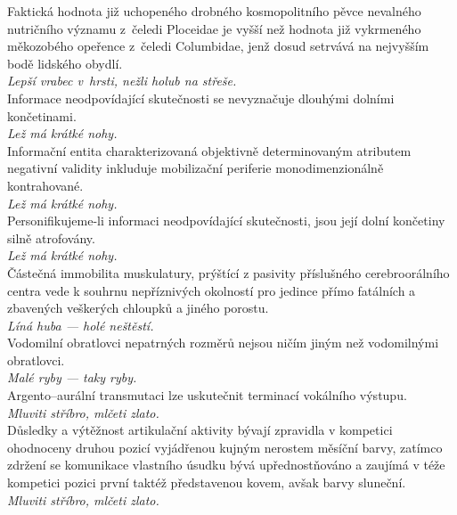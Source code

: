 \begin{multicols}{\value{columnsgames}}
\noindent
Faktická hodnota již uchopeného drobného kosmopolitního pěvce
nevalného nutričního významu z~čeledi Ploceidae je vyšší
než hodnota již vykrmeného měkozobého opeřence z~čeledi
Columbidae, jenž dosud setrvává na nejvyšším bodě lidského obydlí.\\[1 mm]
{\sl Lepší vrabec v~hrsti, nežli holub na střeše.}\\

\noindent
Informace neodpovídající skutečnosti se nevyznačuje dlouhými
dolními končetinami.\\[1 mm]
{\sl Lež má krátké nohy.}\\

\noindent
Informační entita charakterizovaná objektivně determinovaným
atributem negativní validity inkluduje mobilizační periferie
monodimenzionálně kontrahované.\\[1 mm]
{\sl Lež má krátké nohy.}\\

\noindent
Personifikujeme-li informaci neodpovídající skutečnosti, jsou její
dolní končetiny silně atrofovány.\\[1 mm]
{\sl Lež má krátké nohy.}\\

\noindent
Částečná immobilita muskulatury, prýštící z pasivity příslušného
cerebroorálního centra vede k souhrnu nepříznivých okolností
pro jedince přímo fatálních a zbavených veškerých chloupků a
jiného porostu.\\[1 mm]
{\sl Líná huba --- holé neštěstí.}\\

\noindent
Vodomilní obratlovci nepatrných rozměrů nejsou ničím jiným
než vodomilnými obratlovci.\\[1 mm]
{\sl Malé ryby --- taky ryby.}\\

\noindent
Argento--aurální transmutaci lze uskutečnit terminací vokálního
výstupu.\\[1 mm]
{\sl Mluviti stříbro, mlčeti zlato.}\\

\noindent
Důsledky a výtěžnost artikulační aktivity bývají zpravidla
v kompetici ohodnoceny druhou pozicí vyjádřenou kujným nerostem měsíční
barvy, zatímco zdržení se komunikace vlastního úsudku bývá upřednostňováno
a zaujímá v téže kompetici pozici první taktéž představenou kovem,
avšak barvy sluneční.\\[1 mm]
{\sl Mluviti stříbro, mlčeti zlato.}\\


\end{multicols}
